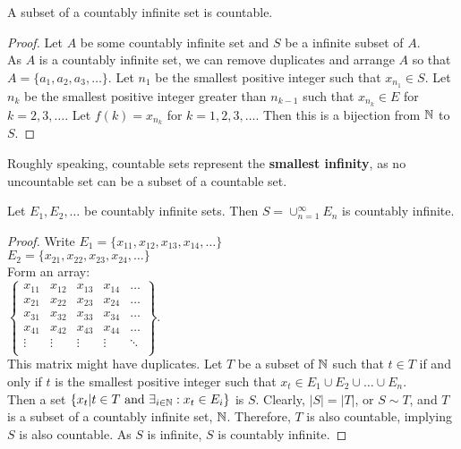 \begin{thm}[8]
	A subset of a countably infinite set is countable.
	\begin{proof}
		Let $A$ be some countably infinite set and $S$ be a infinite subset of $A$.\\
		As $A$ is a countably infinite set, we can remove duplicates and arrange
		$A$ so that $A=\{a_1,a_2,a_3,\ldots\}$.
		Let $n_1$ be the smallest positive integer such that $x_{n_1} \in S$.
		Let $n_k$ be the smallest positive integer greater than $n_{k-1}$ such that $x_{n_{k}} \in E$ for $k=2,3,\ldots$. Let $f(k)=x_{n_k}$ for $k=1,2,3,\ldots$. Then this is a bijection from $\mathbb{N} $ to $S$.
	\end{proof}
	\begin{remark}
		Roughly speaking, countable sets represent the \textbf{smallest infinity}, as no uncountable set can be a subset of a countable set.
	\end{remark}
\end{thm}
\begin{thm}[12]
	\label{thm:countableunion}
	Let $E_1, E_2, \ldots$ be countably infinite sets.
	Then $S=\cup_{n=1}^{\infty} E_n$ is countably infinite.
	\begin{proof}
		Write
		$E_1=\{x_{11},x_{12},x_{13},x_{14},\ldots\} $\\
		$E_2=\{x_{21},x_{22},x_{23},x_{24},\ldots\}$\\
		Form an array: \\
		$
			\begin{Bmatrix}
				x_{11} & x_{12} & x_{13} & x_{14} & \ldots \\
				x_{21} & x_{22} & x_{23} & x_{24} & \ldots \\
				x_{31} & x_{32} & x_{33} & x_{34} & \ldots \\
				x_{41} & x_{42} & x_{43} & x_{44} & \ldots \\
				\vdots & \vdots & \vdots & \vdots & \ddots \\
			\end{Bmatrix}
		$.\\
		This matrix might have duplicates.
		Let $T$ be a subset of $\mathbb{N}$ such that $t \in T$ if and only if
		$t$ is the smallest positive integer such that $x_{t} \in E_1 \cup E_2 \cup \ldots \cup E_n$.\\ Then a set $\{x_t|t \in T \text{ and } \exists_{i \in \mathbb{N} }: x_t \in E_{i}\}$ is $S$.
		Clearly, $|S|=|T|$, or $S\sim T$, and $T$ is a subset of a countably infinite set, $\mathbb{N} $.
		Therefore, $T$ is also countable, implying $S$ is also countable. As $S$ is infinite, $S$ is countably infinite.
	\end{proof}
\end{thm}

